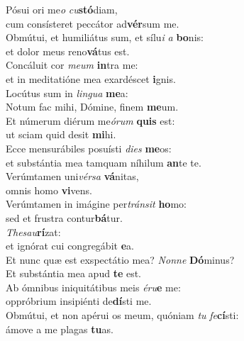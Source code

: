 \evenverse Pósui ori me\textit{o} \textit{cu}\textbf{stó}diam,~\*\\
\evenverse cum consísteret peccátor ad\textbf{vér}sum me.\\
\oddverse Obmútui, et humiliátus sum, et sílu\textit{i} \textit{a} \textbf{bo}nis:~\*\\
\oddverse et dolor meus reno\textbf{vá}tus est.\\
\evenverse Concáluit cor \textit{me}\textit{um} \textbf{in}tra me:~\*\\
\evenverse et in meditatióne mea exardéscet \textbf{i}gnis.\\
\oddverse Locútus sum in \textit{lin}\textit{gua} \textbf{me}a:~\*\\
\oddverse Notum fac mihi, Dómine, finem \textbf{me}um.\\
\evenverse Et númerum diérum me\textit{ó}\textit{rum} \textbf{quis} est:~\*\\
\evenverse ut sciam quid desit \textbf{mi}hi.\\
\oddverse Ecce mensurábiles posuísti \textit{di}\textit{es} \textbf{me}os:~\*\\
\oddverse et substántia mea tamquam níhilum \textbf{an}te te.\\
\evenverse Verúmtamen uni\textit{vér}\textit{sa} \textbf{vá}nitas,~\*\\
\evenverse omnis homo \textbf{vi}vens.\\
\oddverse Verúmtamen in imágine per\textit{trán}\textit{sit} \textbf{ho}mo:~\*\\
\oddverse sed et frustra contur\textbf{bá}tur.\\
\evenverse \textit{The}\textit{sau}\textbf{rí}zat:~\*\\
\evenverse et ignórat cui congregábit \textbf{e}a.\\
\oddverse Et nunc quæ est exspectátio mea? \textit{Non}\textit{ne} \textbf{Dó}minus?~\*\\
\oddverse Et substántia mea apud \textbf{te} est.\\
\evenverse Ab ómnibus iniquitátibus meis \textit{é}\textit{ru}\textbf{e} me:~\*\\
\evenverse oppróbrium insipiénti de\textbf{dí}sti me.\\
\oddverse Obmútui, et non apérui os meum, quóniam \textit{tu} \textit{fe}\textbf{cí}sti:~\*\\
\oddverse ámove a me plagas \textbf{tu}as.\\
